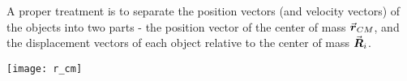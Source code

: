\documentclass[class=article, crop=false, 12pt]{standalone}
\begin{document}
A proper treatment is to separate the position vectors (and velocity vectors) of the objects into two parts - 
the position vector of the center of mass $\va*{r}_{CM}$, 
and the displacement vectors of each object relative to the center of mass $\va*{R}_{i}$.

\begin{center}
    \begin{minipage}{0.95\linewidth}
        \centering
        \texttt{[image: r\_cm]}
    \end{minipage}
\end{center}
\end{document}
